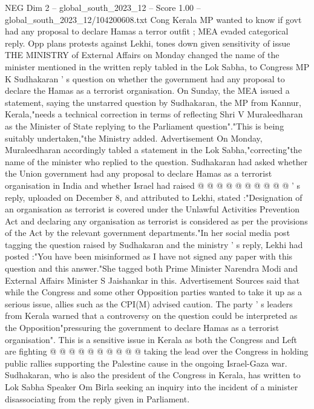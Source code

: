 \begin{textsample}{NEG Dim 2 – global\_south\_2023\_12 – Score 1.00 – global\_south\_2023\_12/104200608.txt}  \label{ex:f2_neg_427}
Cong Kerala MP wanted to know if govt had any proposal to declare Hamas a terror outfit ; MEA evaded categorical reply.
Opp plans protests against Lekhi, tones down given sensitivity of issue THE MINISTRY of External Affairs on Monday changed the name of the minister mentioned in the written reply tabled in the Lok Sabha, to Congress MP K Sudhakaran ' s question on whether the government had any proposal to declare the Hamas as a terrorist organisation.
On Sunday, the MEA issued a statement, saying the unstarred question by Sudhakaran, the MP from Kannur, Kerala,"needs a technical correction in terms of reflecting Shri V Muraleedharan as the Minister of State replying to the Parliament question"."This is being suitably undertaken,"the Ministry added.
Advertisement On Monday, Muraleedharan accordingly tabled a statement in the Lok Sabha,"correcting"the name of the minister who replied to the question.
Sudhakaran had asked whether the Union government had any proposal to declare Hamas as a terrorist organisation in India and whether Israel had raised @ @ @ @ @ @ @ @ @ @ ' s reply, uploaded on December 8, and attributed to Lekhi, stated :"Designation of an organisation as terrorist is covered under the Unlawful Activities Prevention Act and declaring any organisation as terrorist is considered as per the provisions of the Act by the relevant government departments."In her social media post tagging the question raised by Sudhakaran and the ministry ' s reply, Lekhi had posted :"You have been misinformed as I have not signed any paper with this question and this answer."She tagged both Prime Minister Narendra Modi and External Affairs Minister S Jaishankar in this.
Advertisement Sources said that while the Congress and some other Opposition parties wanted to take it up as a serious issue, allies such as the CPI(M) advised caution.
The party ' s leaders from Kerala warned that a controversy on the question could be interpreted as the Opposition"pressuring the government to declare Hamas as a terrorist organisation".
This is a sensitive issue in Kerala as both the Congress and Left are fighting @ @ @ @ @ @ @ @ @ @ taking the lead over the Congress in holding public rallies supporting the Palestine cause in the ongoing Israel-Gaza war.
Sudhakaran, who is also the president of the Congress in Kerala, has written to Lok Sabha Speaker Om Birla seeking an inquiry into the incident of a minister disassociating from the reply given in Parliament.

\end{textsample}
